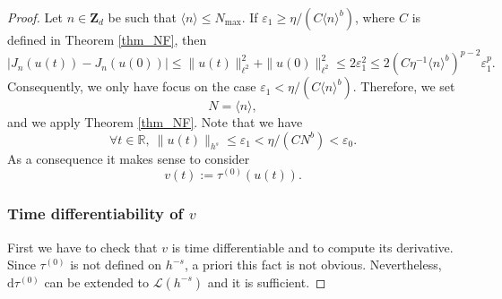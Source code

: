 \begin{proof} Let $n\in \mathbf{Z}_d$ be such that $\langle n \rangle \leq N_{\max}$. If $\varepsilon_1 \geq \eta /(C \langle n \rangle^{b})$, where $C$ is defined in Theorem \ref{thm_NF}, then
\[
|J_n(u(t))-J_n(u(0))| \leq \|u(t) \|_{\ell^2}^2 + \|u(0) \|_{\ell^2}^2 \leq 2 \varepsilon_1^2
\leq 2 (C \eta^{-1}\langle n \rangle^{b})^{p-2} \varepsilon_1^p.
\]
Consequently, we only have focus on the case $\varepsilon_1 < \eta /(C \langle n \rangle^{b})$. Therefore, we set
\[
N= \langle n \rangle,
\]
and we apply Theorem \ref{thm_NF}. Note that we have\vspace*{-3pt}
\[
\forall t \in \mathbb{R}, \ \| u(t) \|_{h^s}\leq \varepsilon_1 < \eta /(C N^{b}) <\varepsilon_0.
\]
As a consequence it makes sense to consider\vspace*{-3pt}
\[
v(t):= \tau^{(0)}(u(t)).
\]

\subsubsection*{Time differentiability of $v$}
First we have to check that $v$ is time differentiable and to compute its derivative. Since $\tau^{(0)}$ is not defined on $h^{-s}$, a priori this fact is not obvious. Nevertheless, $\mathrm{d}\tau^{(0)}$ can be extended to $\mathscr{L}(h^{-s})$ and it is sufficient.


\end{proof}
